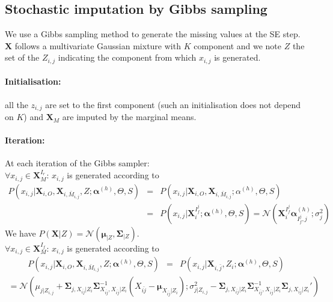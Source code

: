 \documentclass[11pt,a4paper]{report}
\begin{document}
	\subsection{Stochastic imputation by Gibbs sampling}
		We use a Gibbs sampling method to generate the missing values at the SE step. $\boldsymbol{X}$ follows a multivariate Gaussian mixture with $K$ component and we note $Z$ the set of the $Z_{i,j}$ indicating the component from which $x_{i,j}$ is generated.
		\paragraph{Initialisation:} all the $z_{i,j}$ are set to the first component (such an initialisation does not depend on $K$) and $\boldsymbol{X}_M$ are imputed by the marginal means.
		\paragraph{Iteration:} At each iteration of the Gibbs sampler: \\
			$\forall x_{i,j} \in \boldsymbol{X}_M^{I_r}$:  $x_{i,j}$ is generated according to 
			\begin{eqnarray}
			P(x_{i,j}|\boldsymbol{X}_{i,O},\boldsymbol{X}_{i,\bar{M}_{i,j}},Z;\boldsymbol{\alpha}^{(h)},\Theta,S)&=&P(x_{i,j}|\boldsymbol{X}_{i,O},\boldsymbol{X}_{i,\bar{M}_{i,j}};\alpha^{(h)},\Theta,S) \\
			&=&P(x_{i,j}|\boldsymbol{X}_i^{I_f^j};\boldsymbol{\alpha}^{(h)},\Theta,S)=\mathcal{N}(\boldsymbol{X}_i^{I_f^j}\boldsymbol{\alpha}^{(h)}_{I_f^j,j};\sigma_j^2 )
			\end{eqnarray}		
			We have $P(\boldsymbol{X}|Z)=\mathcal{N}(\boldsymbol{\mu}_{|Z},\boldsymbol{\Sigma}_{|Z})$. \\
			$\forall x_{i,j} \in \boldsymbol{X}_M^{I_f}$:  $x_{i,j}$ is generated according to 
			\begin{eqnarray}
			P(x_{i,j}|\boldsymbol{X}_{i,O},\boldsymbol{X}_{i,\bar{M}_{i,j}},Z;\boldsymbol{\alpha}^{(h)},\Theta,S)&=&P(x_{i,j}|\boldsymbol{X}_{i,\bar{j}},Z_i;\boldsymbol{\alpha}^{(h)},\Theta,S)			\end{eqnarray}			
			\begin{eqnarray}
			=\mathcal{N}(\mu_{j|Z_{i,j}} + \boldsymbol{\Sigma}_{j,X_{\bar{ij}}|Z_i}\boldsymbol{\Sigma}^{-1}_{X_{\bar{ij}},X_{\bar{ij}}|Z_i}(X_{\bar{ij}}-\boldsymbol{\mu}_{X_{\bar{ij}}|Z_i}) ;  \sigma_{j|Z_{i,j}}^2-\boldsymbol{\Sigma}_{j,X_{\bar{ij}}|Z_i}\boldsymbol{\Sigma}^{-1}_{X_{\bar{ij}},X_{\bar{ij}}|Z_i}\boldsymbol{\Sigma}_{j,X_{\bar{ij}}|Z_i}')
			\end{eqnarray}		
\end{document}
